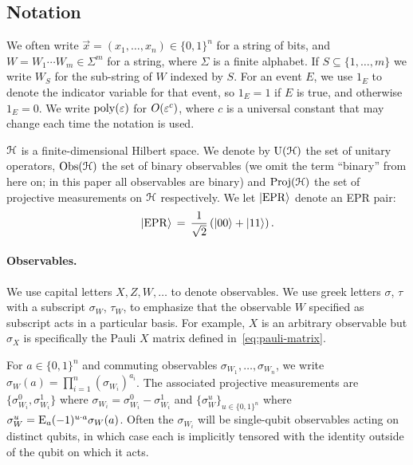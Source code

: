 \subsection{Notation}
\label{sec:prelim-notation}

We often write $\vec{x} =(x_1,\ldots,x_n)\in \{0,1\}^n$ for a string of bits, and $W=W_1\cdots W_m\in\Sigma^m$ for a string, where $\Sigma$ is a finite alphabet. If $S\subseteq \{1,\ldots,m\}$ we write $W_S$ for the sub-string of $W$ indexed by $S$. For an event $E$, we use $1_{E}$ to denote the indicator variable for that event, so $1_E=1$ if $E$ is true, and otherwise $1_E=0$. We write $\operatorname{poly}(\varepsilon)$ for $O(\varepsilon^c)$, where $c$ is a universal constant that may change each time the notation is used. 

$\mathcal{H}$ is a finite-dimensional Hilbert space.  We denote by $\mathrm{U}(\mathcal{H})$ the set of unitary operators, $\mathrm{Obs}(\mathcal{H})$ the set of binary observables (we omit the term ``binary'' from here on; in this paper all observables are binary) and $\mathrm{Proj}(\mathcal{H})$ the set of projective measurements on $\mathcal{H}$ respectively.  
We let $|{\rm EPR}\rangle$ denote an EPR pair: 
$$|{\rm EPR}\rangle\,=\,\frac{1}{\sqrt{2}}\left(|00\rangle+|11\rangle\right).$$


\paragraph{Observables.}
We use capital letters $X,Z,W,\ldots$ to denote observables. We use greek letters $\sigma$, $\tau$ with a subscript $\sigma_W$, $\tau_W$, to emphasize that the observable $W$ specified as subscript acts in a particular basis. For example, $X$ is an arbitrary observable but $\sigma_X$ is specifically the Pauli $X$ matrix defined in~\eqref{eq:pauli-matrix}.

For $a\in\{0,1\}^n$ and commuting observables $\sigma_{W_1},\ldots,\sigma_{W_n}$, we write $\sigma_W(a) = \prod_{i=1}^n (\sigma_{W_i})^{a_i}$. The associated projective measurements are $\{\sigma_{W_i}^0,\sigma_{W_i}^1\}$ where $\sigma_{W_i} = \sigma_{W_i}^0 - \sigma_{W_i}^1$ and $\{\sigma_W^u\}_{u\in\{0,1\}^n}$ where $\sigma_W^u = \mathop{\textsc{E}}_{a} (-1)^{u\cdot a} \sigma_W(a)$.  Often the $\sigma_{W_i}$ will be single-qubit observables acting on distinct qubits, in which case each is implicitly tensored with the identity outside of the qubit on which it acts. 


